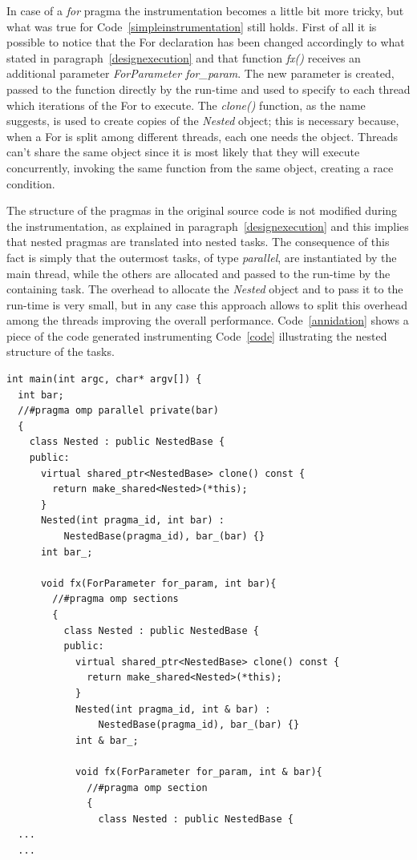 \documentclass[a4paper,12pt,oneside]{book}
\begin{document}
In case of a \emph{for} pragma the instrumentation becomes a little bit more tricky, but what was true for Code~\ref{simpleinstrumentation} still holds. First of all it is possible to notice that the For declaration has been changed accordingly to what stated in paragraph~\ref{designexecution} and that function \emph{fx()} receives an additional parameter \emph{ForParameter for\_param}. The new parameter is created, passed to the function directly by the run-time and used to specify to each thread which iterations of the For to execute. The \emph{clone()} function, as the name suggests, is used to create copies of the \emph{Nested} object; this is necessary because, when a For is split among different threads, each one needs the object. Threads can’t share the same object since it is most likely that they will execute concurrently, invoking the same function from the same object, creating a race condition. 

The structure of the pragmas in the original source code is not modified during the instrumentation, as explained in paragraph~\ref{designexecution} and this implies that nested pragmas are translated into nested tasks. The consequence of this fact is simply that the outermost tasks, of type \emph{parallel}, are instantiated by the main thread, while the others are allocated and passed to the run-time by the containing task. The overhead to allocate the \emph{Nested} object and to pass it to the run-time is very small, but in any case this approach allows to split this overhead among the threads improving the overall performance. Code~\ref{annidation} shows a piece of the code generated instrumenting Code~\ref{code} illustrating the nested structure of the tasks.

\begin{lstlisting}[language=CCC, caption=Example of tasks annidation from Code~\ref{code}., label=annidation]
int main(int argc, char* argv[]) {
  int bar;
  //#pragma omp parallel private(bar)
  {
    class Nested : public NestedBase {
    public: 
      virtual shared_ptr<NestedBase> clone() const { 
        return make_shared<Nested>(*this); 
      } 
      Nested(int pragma_id, int bar) : 
          NestedBase(pragma_id), bar_(bar) {}
      int bar_;
  
      void fx(ForParameter for_param, int bar){
        //#pragma omp sections
        {
          class Nested : public NestedBase {
          public: 
            virtual shared_ptr<NestedBase> clone() const { 
              return make_shared<Nested>(*this); 
            } 
            Nested(int pragma_id, int & bar) : 
                NestedBase(pragma_id), bar_(bar) {}
            int & bar_;
            
            void fx(ForParameter for_param, int & bar){
              //#pragma omp section
              {
                class Nested : public NestedBase {
  ...
  ...
\end{lstlisting}
\end{document}
